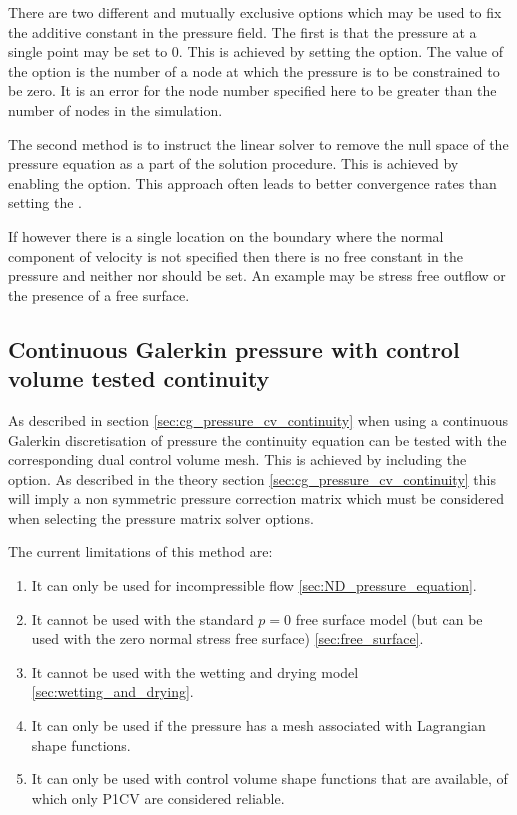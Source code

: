 There are two different and mutually exclusive options which may be used to
fix the additive constant in the pressure field. The first is that the
pressure at a single point may be set to 0. This is achieved by setting the
 option. The
value of the option is the number of a node at which the pressure is to be
constrained to be zero. It is an error for the node number specified here to
be greater than the number of nodes in the simulation.

The second method is to instruct the linear solver to remove the null space
of the pressure equation as a part of the solution procedure. This is
achieved by enabling the\linebreak
{}
option. This approach often leads to better convergence rates than setting
the .

If however there is a single location on the boundary where the normal
component of velocity is not specified then there is no free constant in the
pressure and neither  nor
 should be set. An example
may be stress free outflow or the presence of a free surface.

\subsection{Continuous Galerkin pressure with control volume tested continuity}
\label{sec:config_cg_pressure_cv_continuity}

As described in section \ref{sec:cg_pressure_cv_continuity} when using a continuous Galerkin
discretisation of pressure the continuity equation can be tested with the corresponding
dual control volume mesh. This is achieved by including the \linebreak
{}
option. As described in the theory section \ref{sec:cg_pressure_cv_continuity} this will imply a
non symmetric pressure correction matrix which must be considered when selecting the pressure
matrix solver options.

The current limitations of this method are:
\begin{enumerate}
  \item It can only be used for incompressible flow \ref{sec:ND_pressure_equation}.
  \item It cannot be used with the standard $p=0$ free surface model (but can be used with the zero normal stress free surface) \ref{sec:free_surface}.
  \item It cannot be used with the wetting and drying model \ref{sec:wetting_and_drying}.
  \item It can only be used if the pressure has a mesh associated with Lagrangian shape functions.
  \item It can only be used with control volume shape functions that are available, of which only P1CV are considered reliable.
\end{enumerate}

